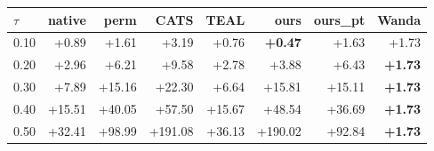 \begin{tabular}{lrrrrrrr}
\toprule
$\tau$ & native & perm & CATS & TEAL & ours & ours\_pt & Wanda \\
\midrule
0.10 & +0.89 & +1.61 & +3.19 & +0.76 & \textbf{+0.47} & +1.63 & +1.73 \\
0.20 & +2.96 & +6.21 & +9.58 & +2.78 & +3.88 & +6.43 & \textbf{+1.73} \\
0.30 & +7.89 & +15.16 & +22.30 & +6.64 & +15.81 & +15.11 & \textbf{+1.73} \\
0.40 & +15.51 & +40.05 & +57.50 & +15.67 & +48.54 & +36.69 & \textbf{+1.73} \\
0.50 & +32.41 & +98.99 & +191.08 & +36.13 & +190.02 & +92.84 & \textbf{+1.73} \\
\bottomrule
\end{tabular}
